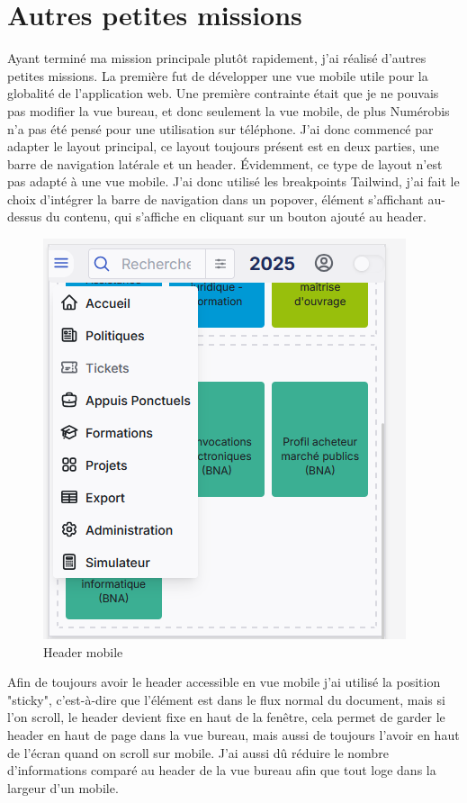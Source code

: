 \documentclass[a4paper,12pt]{report}
\begin{document}
\section{Autres petites missions}
Ayant terminé ma mission principale plutôt rapidement, j'ai réalisé d'autres petites missions. La première fut de développer une vue mobile utile pour la globalité de l'application web. Une première contrainte était que je ne pouvais pas modifier la vue bureau, et donc seulement la vue mobile, de plus Numérobis n'a pas été pensé pour une utilisation sur téléphone. J'ai donc commencé par adapter le layout principal, ce layout toujours présent est en deux parties, une barre de navigation latérale et un header. Évidemment, ce type de layout n'est pas adapté à une vue mobile. J'ai donc utilisé les breakpoints Tailwind, j'ai fait le choix d'intégrer la barre de navigation dans un popover, élément s'affichant au-dessus du contenu, qui s'affiche en cliquant sur un bouton ajouté au header.

\begin{figure}[H]
    \centering
    \includegraphics[scale=0.6]{headerMob.png}
    \caption{Header mobile}
    \label{fig:header-mob}
\end{figure}

Afin de toujours avoir le header accessible en vue mobile j'ai utilisé la position "sticky", c'est-à-dire que l'élément est dans le flux normal du document, mais si l'on scroll, le header devient fixe en haut de la fenêtre, cela permet de garder le header en haut de page dans la vue bureau, mais aussi de toujours l'avoir en haut de l'écran quand on scroll sur mobile. J'ai aussi dû réduire le nombre d'informations comparé au header de la vue bureau afin que tout loge dans la largeur d'un mobile.
\end{document}
